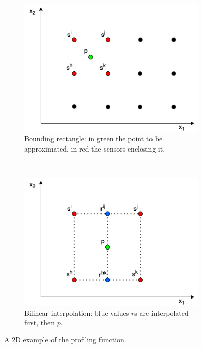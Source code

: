 \begin{figure}[t]
\centering
\begin{subfigure}[t]{.45\textwidth}
\centering
\includegraphics[scale=.4]{chapters/physics-aware/orchard/img/statistical_profiling_function.png}
\caption{Bounding rectangle: in green the point to be approximated, in red the sensors enclosing it.}
\label{orchard-fig:statistical-profiling-function}
\end{subfigure}
~
\begin{subfigure}[t]{.45\textwidth}
\centering
\includegraphics[scale=.4]{chapters/physics-aware/orchard/img/bilinear_interpolation.png}
\caption{Bilinear interpolation: blue values $r$s are interpolated first, then $p$.}
\label{orchard-fig:bilinear-interpolation}
\end{subfigure}
\caption{A 2D example of the profiling function.}
\label{orchard-fig:statistical-profiling-function-explanation}
\end{figure}

